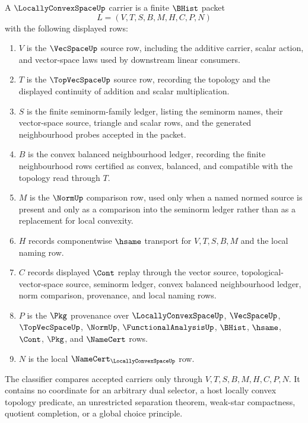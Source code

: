 \begin{definition}
\label{def:locally-convex-space-carrier}
A $\LocallyConvexSpaceUp$ carrier is a finite $\BHist$ packet
$$
L=(V,T,S,B,M,H,C,P,N)
$$
with the following displayed rows:
\begin{enumerate}
\item $V$ is the $\VecSpaceUp$ source row, including the additive carrier, scalar action, and vector-space laws used by downstream linear consumers.
\item $T$ is the $\TopVecSpaceUp$ source row, recording the topology and the displayed continuity of addition and scalar multiplication.
\item $S$ is the finite seminorm-family ledger, listing the seminorm names, their vector-space source, triangle and scalar rows, and the generated neighbourhood probes accepted in the packet.
\item $B$ is the convex balanced neighbourhood ledger, recording the finite neighbourhood rows certified as convex, balanced, and compatible with the topology read through $T$.
\item $M$ is the $\NormUp$ comparison row, used only when a named normed source is present and only as a comparison into the seminorm ledger rather than as a replacement for local convexity.
\item $H$ records componentwise $\hsame$ transport for $V,T,S,B,M$ and the local naming row.
\item $C$ records displayed $\Cont$ replay through the vector source, topological-vector-space source, seminorm ledger, convex balanced neighbourhood ledger, norm comparison, provenance, and local naming rows.
\item $P$ is the $\Pkg$ provenance over $\LocallyConvexSpaceUp$, $\VecSpaceUp$, $\TopVecSpaceUp$, $\NormUp$, $\FunctionalAnalysisUp$, $\BHist$, $\hsame$, $\Cont$, $\Pkg$, and $\NameCert$ rows.
\item $N$ is the local $\NameCert_{\LocallyConvexSpaceUp}$ row.
\end{enumerate}
The classifier compares accepted carriers only through $V,T,S,B,M,H,C,P,N$. It contains no coordinate for an arbitrary dual selector, a host locally convex topology predicate, an unrestricted separation theorem, weak-star compactness, quotient completion, or a global choice principle.
\end{definition}

